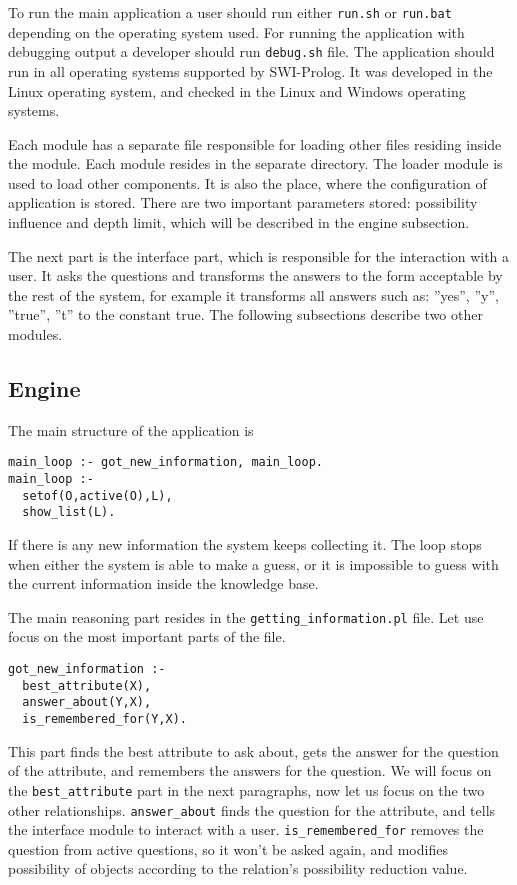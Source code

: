 \documentclass[a4paper]{article}
\begin{document}
To run the main application a user should run either \verb|run.sh| or \verb|run.bat| depending on the operating system used. For running the application with debugging output a developer should run \verb|debug.sh| file. The application should run in all operating systems supported by SWI-Prolog. It was developed in the Linux operating system, and checked in the Linux and Windows operating systems. 

Each module has a separate file responsible for loading other files residing inside the module. Each module resides in the separate directory. The loader module is used to load other components. It is also the place, where the configuration of application is stored. There are two important parameters stored: possibility influence and depth limit, which will be described in the engine subsection.

The next part is the interface part, which is responsible for the interaction with a user. It asks the questions and transforms the answers to the form acceptable by the rest of the system, for example it transforms all answers such as: ''yes'', ''y'', ''true'', ''t'' to the constant true. The following subsections describe two other modules.
\subsection{Engine}
The main structure of the application is
\begin{lstlisting}[caption=main\_loop.pl,label=lst:mainloop]
main_loop :- got_new_information, main_loop.
main_loop :- 
  setof(O,active(O),L),
  show_list(L).
\end{lstlisting}
If there is any new information the system keeps collecting it. The loop stops when either the system is able to make a guess, or it is impossible to guess with the current information inside the knowledge base. 

The main reasoning part resides in the \verb|getting_information.pl| file. Let use focus on the most important parts of the file.
\begin{lstlisting}[caption=got\_new\_information,label=lst:gotnewinfo]
got_new_information :- 
  best_attribute(X),
  answer_about(Y,X),
  is_remembered_for(Y,X).
\end{lstlisting}
This part finds the best attribute to ask about, gets the answer for the question of the attribute, and remembers the answers for the question.
We will focus on the \verb|best_attribute| part in the next paragraphs, now let us focus on the two other relationships. \verb|answer_about| finds the question for the attribute, and tells the interface module to interact with a user. \verb|is_remembered_for| removes the question from active questions, so it won't be asked again, and modifies possibility of objects according to the relation's possibility reduction value.
\end{document}
